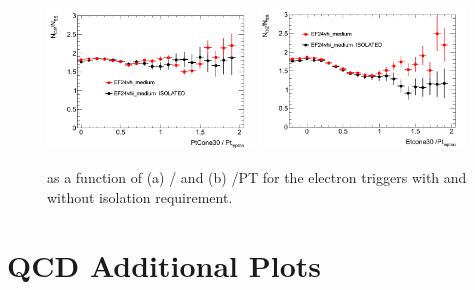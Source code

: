 \begin{figure}[t]
\begin{center}
\includegraphics[width=0.49\textwidth]{figure/appendix/trig_comp_ptcone3.png}
\includegraphics[width=0.49\textwidth]{figure/appendix/trig_comp_etcone3.png}
\end{center}
\caption{\rqcd  as a function of (a) \ptcone / \PT and (b) \etcone /PT for the electron triggers with and without isolation requirement.} 
\label{fig:trigRatio}
\end{figure}

\clearpage

\section{QCD Additional Plots}
\label{appendix:qcd_additional}

